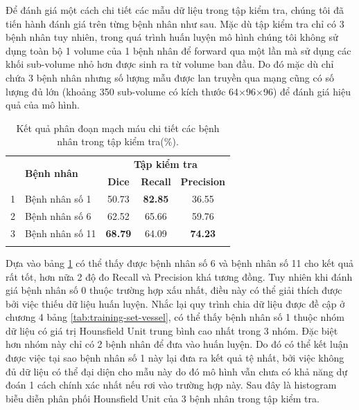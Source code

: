 Để đánh giá một cách chi tiết các mẫu dữ liệu trong tập kiểm tra, chúng tôi đã tiến hành đánh giá trên từng bệnh nhân như sau. Mặc dù tập kiểm tra chỉ có 3 bệnh nhân tuy nhiên, trong quá trình huấn luyện mô hình chúng tôi không sử dụng toàn bộ 1 volume của 1 bệnh nhân để forward qua một lần mà sử dụng các khối sub-volume nhỏ hơn được sinh ra từ volume ban đầu. Do đó mặc dù chỉ chứa 3 bệnh nhân nhưng số lượng mẫu được lan truyền qua mạng cũng có số lượng đủ lớn (khoảng 350 sub-volume có kích thước 64$\times$96$\times$96) để đánh giá hiệu quả của mô hình. 
\begin{table}[H]
    \renewcommand{\arraystretch}{1.1}
    \centering
    \begin{tabular}{c l c c c}
        \Xhline{2\arrayrulewidth}
        \multirow{2}{*}{\textbf{STT}} & \multirow{2}{*}{\textbf{Bệnh nhân}} & \multicolumn{3}{c}{\textbf{Tập kiểm tra}} \\ \cline{3-5}
        & &  \textbf{Dice} & \textbf{Recall} & \textbf{Precision} \\ 
        \Xhline{2\arrayrulewidth}
        1   & Bệnh nhân số 1 & 50.73 & \textbf{82.85} & 36.55\\
        2   & Bệnh nhân số 6 & 62.52 & 65.66 & 59.76 \\
        3   & Bệnh nhân số 11 & \textbf{68.79} & 64.09 & \textbf{74.23} \\
        \Xhline{2\arrayrulewidth}
    \end{tabular}
    \caption{Kết quả phân đoạn mạch máu chi tiết các bệnh nhân trong tập kiểm tra(\%).}
    \label{tab:vessel-result-patient}
\end{table}

Dựa vào bảng \ref{tab:vessel-result-patient} có thể thấy được bệnh nhân số 6 và bệnh nhân số 11 cho kết quả rất tốt, hơn nữa 2 độ đo Recall và Precision khá tương đồng. Tuy nhiên khi đánh giá bệnh nhân số 0 thuộc trường hợp xấu nhất, điều này có thể giải thích được bởi việc thiếu dữ liệu huấn luyện. Nhắc lại quy trình chia dữ liệu được đề cập ở chương 4 bảng \ref{tab:training-set-vessel}, có thể thấy bệnh nhân số 1 thuộc nhóm dữ liệu có giá trị Hounsfield Unit trung bình cao nhất trong 3 nhóm. Đặc biệt hơn nhóm này chỉ có 2 bệnh nhân để đưa vào huấn luyện. Do đó có thể kết luận được việc tại sao bệnh nhân số 1 này lại đưa ra kết quả tệ nhất, bởi việc không đủ dữ liệu có thể đại diện cho mẫu này do đó mô hình vẫn chưa có khả năng dự đoán 1 cách chính xác nhất nếu rơi vào trường hợp này. Sau đây là histogram biễu diễn phân phối Hounsfield Unit của 3 bệnh nhân trong tập kiểm tra.

